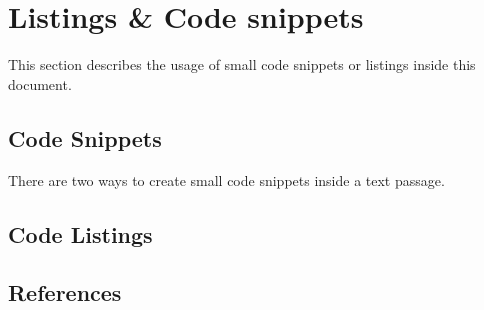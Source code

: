 \section{Listings \& Code snippets}
This section describes the usage of small code snippets or listings inside this
document.

\subsection{Code Snippets}
There are two ways to create small code snippets inside a text passage.
\subsection{Code Listings}
\subsection{References}
